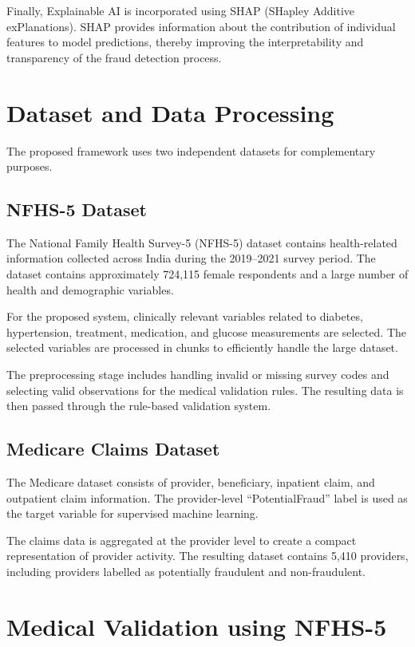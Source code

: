 Finally, Explainable AI is incorporated using SHAP (SHapley Additive exPlanations). SHAP provides information about the contribution of individual features to model predictions, thereby improving the interpretability and transparency of the fraud detection process.

\section{Dataset and Data Processing}

The proposed framework uses two independent datasets for complementary purposes.

\subsection{NFHS-5 Dataset}

The National Family Health Survey-5 (NFHS-5) dataset contains health-related information collected across India during the 2019--2021 survey period. The dataset contains approximately 724,115 female respondents and a large number of health and demographic variables.

For the proposed system, clinically relevant variables related to diabetes, hypertension, treatment, medication, and glucose measurements are selected. The selected variables are processed in chunks to efficiently handle the large dataset.

The preprocessing stage includes handling invalid or missing survey codes and selecting valid observations for the medical validation rules. The resulting data is then passed through the rule-based validation system.

\subsection{Medicare Claims Dataset}

The Medicare dataset consists of provider, beneficiary, inpatient claim, and outpatient claim information. The provider-level ``PotentialFraud'' label is used as the target variable for supervised machine learning.

The claims data is aggregated at the provider level to create a compact representation of provider activity. The resulting dataset contains 5,410 providers, including providers labelled as potentially fraudulent and non-fraudulent.

\section{Medical Validation using NFHS-5}

